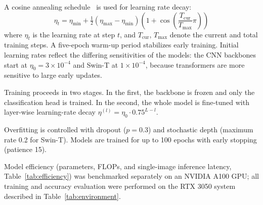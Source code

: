 \documentclass[conference]{IEEEtran}
\begin{document}
A cosine annealing schedule~\cite{loshchilov2017sgdr} is used for learning rate decay:
\begin{equation}
    \eta_t = \eta_{\min} + \tfrac{1}{2}(\eta_{\max} - \eta_{\min})
    \left(1 + \cos\!\left(\frac{T_{\mathrm{cur}}}{T_{\mathrm{max}}}\pi\right)\right)
    \label{eq:cosine}
\end{equation}
where $\eta_t$ is the learning rate at step $t$, and $T_{\mathrm{cur}}$, $T_{\mathrm{max}}$ denote the current and total training steps. A five-epoch warm-up period stabilizes early training. Initial learning rates reflect the differing sensitivities of the models: the CNN backbones start at $\eta_0=3\times10^{-4}$ and Swin-T at $1\times10^{-4}$, because transformers are more sensitive to large early updates.

Training proceeds in two stages. In the first, the backbone is frozen and only the classification head is trained. In the second, the whole model is fine-tuned with layer-wise learning-rate decay $\eta^{(l)}=\eta_0\cdot0.75^{L-l}$.

Overfitting is controlled with dropout ($p=0.3$) and stochastic depth (maximum rate 0.2 for Swin-T). Models are trained for up to 100 epochs with early stopping (patience 15).

Model efficiency (parameters, FLOPs, and single-image inference latency, Table~\ref{tab:efficiency}) was benchmarked separately on an NVIDIA A100 GPU; all training and accuracy evaluation were performed on the RTX 3050 system described in Table~\ref{tab:environment}.

\end{document}
